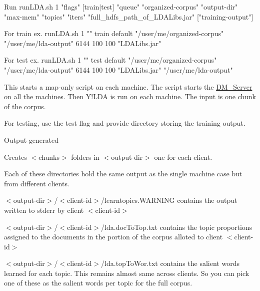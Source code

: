 \begin{DoxyEnumerate}
\begin{DoxyEnumerate}
\begin{DoxyEnumerate}
Run {\ttfamily runLDA.sh 1 "flags" \mbox{[}train$|$test\mbox{]} "queue" "organized-\/corpus" "output-\/dir" "max-\/mem" "topics" "iters" "full\_\-hdfs\_\-path\_\-of\_\-LDALibs.jar" \mbox{[}"training-\/output"\mbox{]} }\par
\par
 For train ex. {\ttfamily runLDA.sh 1 "" train default "/user/me/organized-\/corpus" "/user/me/lda-\/output" 6144 100 100 "LDALibs.jar" }\par
\par
 For test ex. {\ttfamily runLDA.sh 1 "" test default "/user/me/organized-\/corpus" "/user/me/lda-\/output" 6144 100 100 "LDALibs.jar" "/user/me/lda-\/output" }  
\item 

This starts a map-\/only script on each machine. The script starts the \hyperlink{class_d_m___server}{DM\_\-Server} on all the machines. Then Y!LDA is run on each machine. The input is one chunk of the corpus. 
\item 

For testing, use the test flag and provide directory storing the training output. 
\end{DoxyEnumerate}
\item 

Output generated 
\begin{DoxyEnumerate}
\item 

Creates $<$chunks$>$ folders in $<$output-\/dir$>$ one for each client.  
\item 

Each of these directories hold the same output as the single machine case but from different clients.  
\item 

$<$output-\/dir$>$/$<$client-\/id$>$/learntopics.WARNING contains the output written to stderr by client $<$client-\/id$>$ 
\item 

$<$output-\/dir$>$/$<$client-\/id$>$/lda.docToTop.txt contains the topic proportions assigned to the documents in the portion of the corpus alloted to client $<$client-\/id$>$ 
\item 

$<$output-\/dir$>$/$<$client-\/id$>$/lda.topToWor.txt contains the salient words learned for each topic. This remains almost same across clients. So you can pick one of these as the salient words per topic for the full corpus. 
\item 


\end{DoxyEnumerate}
\end{DoxyEnumerate}
\end{DoxyEnumerate}
